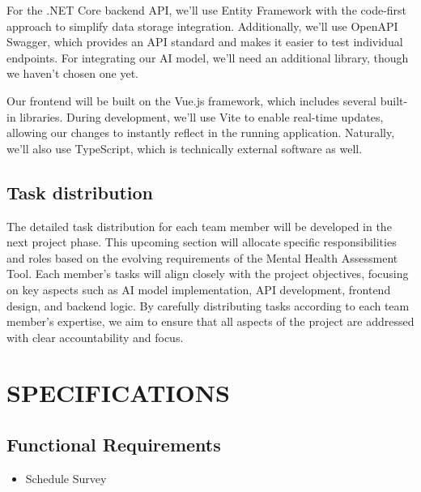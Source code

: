 \documentclass[conference]{IEEEtran}
\begin{document}
    For the .NET Core backend API, we’ll use Entity Framework with the 
    code-first approach to simplify data storage integration. Additionally, 
    we’ll use OpenAPI Swagger, which provides an API standard and makes it 
    easier to test individual endpoints. For integrating our AI model, we’ll 
    need an additional library, though we haven’t chosen one yet.

    Our frontend will be built on the Vue.js framework, which includes several 
    built-in libraries. During development, we’ll use Vite to enable real-time 
    updates, allowing our changes to instantly reflect in the running application. 
    Naturally, we’ll also use TypeScript, which is technically external 
    software as well.

    \newline

    \subsection {Task distribution}

    The detailed task distribution for each team member will be 
    developed in the next project phase. This upcoming section 
    will allocate specific responsibilities and roles based 
    on the evolving requirements of the Mental Health Assessment 
    Tool. Each member’s tasks will align closely with the project 
    objectives, focusing on key aspects such as AI model 
    implementation, API development, frontend design, and backend 
    logic. By carefully distributing tasks according to each team 
    member’s expertise, we aim to ensure that all aspects of the 
    project are addressed with clear accountability and focus.
    \newline

    \section{SPECIFICATIONS}


    \subsection {Functional Requirements}
   
    \begin{itemize}
        \item Schedule Survey 
        \end{itemize}
\end{document}
